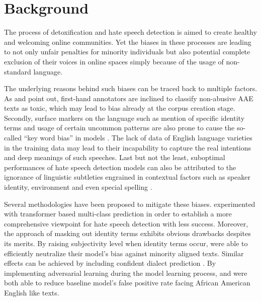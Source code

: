 \documentclass[11pt]{article}
\begin{document}
\section{Background}

The process of detoxification and hate speech detection is aimed to create healthy and welcoming online communities. Yet the biases in these processes are leading to not only unfair penalties for minority individuals \citep{davidson-etal-2019-racial} but also potential complete exclusion of their voices in online spaces \citep{blodgett-2017-racial} simply because of the usage of non-standard language.

The underlying reasons behind such biases can be traced back to multiple factors. As \citet{xia-etal-2020-demoting} and \citet{sap-etal-2022-annotators} point out, first-hand annotators are inclined to classify non-abusive AAE texts as toxic, which may lead to bias already at the corpus creation stage. Secondly, surface markers on the language such as mention of specific identity terms and usage of certain uncommon patterns are also prone to cause the so-called \enquote{key word bias} in models \citep{resende-2024-comprehensive, schafer-2023-bias}. The lack of data of English language varieties in the training data may lead to their incapability to capture the real intentions and deep meanings of such speeches. Last but not the least, suboptimal performances of hate speech detection models can also be attributed to the ignorance of linguistic subtleties engrained in contextual factors such as speaker identity, environment and even special spelling \citep{davidson-etal-2019-racial}.

Several methodologies have been proposed to mitigate these biases. \citet{schafer-2023-bias} experimented with transformer based multi-class prediction in order to establish a more comprehensive viewpoint for hate speech detection with less success. Moreover, the approach of masking out identity terms exhibits obvious drawbacks despites its merits. By raising subjectivity level when identity terms occur, \citep{zhao-2022-subjectivity} were able to efficiently neutralize their model’s bias against minority aligned texts. Similar effects can be achieved by including confident dialect prediction \citep{ball-2021-differential}. By implementing adversarial learning during the model learning process, \citet{xia-etal-2020-demoting} and \citep{okpala-2022-aaebert} were both able to reduce baseline model’s false positive rate facing African American English like texts.
\end{document}
